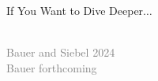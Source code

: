\documentclass[xcolor=table,9pt,aspectratio=169]{beamer}
\begin{document}
\begin{frame}{\vspace*{10mm}If You Want to Dive Deeper$\ldots$}
\begin{multicols}{2}
   \begin{center}
      \\
      \textcolor{gray}{Bauer and Siebel 2024}
      \\
      \textcolor{gray}{Bauer forthcoming}
   \end{center}
\end{multicols}
\end{frame}
\end{document}
